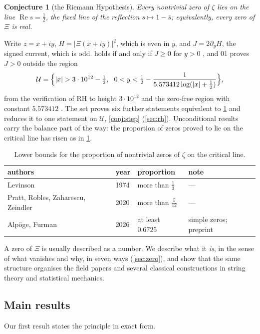 \documentclass[11pt]{article}
\newtheorem{conjecture}{Conjecture}
\theoremstyle{definition}\newtheorem{definition}[theorem]{Definition}
\theoremstyle{remark}\newtheorem{remark}[theorem]{Remark}
\renewcommand{\Re}{\operatorname{Re}}\renewcommand{\Im}{\operatorname{Im}}
\begin{document}
\begin{conjecture}[the Riemann Hypothesis]\label{conj:RH}
Every nontrivial zero of $\zeta$ lies on the line $\Re s=\frac12$, the fixed line of the reflection $s\mapsto1-\bar s$; equivalently, every zero of $\Xi$ is real.
\end{conjecture}

Write $z=x+iy$, $H=|\Xi(x+iy)|^2$, which is even in $y$, and $J=2\partial_yH$, the signed current, which is odd.  holds if and only if $J\ge0$ for $y>0$ \cite{SD,Lagarias,SMath}, and 01 proves $J>0$ outside the region
\[
\mathcal U=\Bigl\{|x|>3\cdot10^{12}-\tfrac12,\ \ 0<y<\tfrac12-\frac1{5.573412\log(|x|+\frac12)}\Bigr\},
\]
from the verification of RH to height $3\cdot10^{12}$ \cite{PT} and the zero-free region with constant $5.573412$ \cite{MT}. The set proves six further statements equivalent to \cref{conj:RH} and reduces it to one statement on $\mathcal U$, \cref{conj:step} (\cref{sec:rh}). Unconditional results carry the balance part of the way: the proportion of zeros proved to lie on the critical line has risen as in \cref{tab:prior}.

\begin{table}[ht]\centering\small
\caption{Lower bounds for the proportion of nontrivial zeros of $\zeta$ on the critical line.}\label{tab:prior}
\begin{tabular}{@{}llll@{}}\toprule
authors & year & proportion & note\\\midrule
Levinson \cite{Levinson} & 1974 & more than $\frac13$ & ---\\
Pratt, Robles, Zaharescu, Zeindler \cite{PRZZ} & 2020 & more than $\frac5{12}$ & ---\\
Alp\"oge, Furman \cite{AF} & 2026 & at least $0.6725$ & simple zeros; preprint\\\bottomrule
\end{tabular}
\end{table}

A zero of $\Xi$ is usually described as a number. We describe what it \emph{is}, in the sense of what vanishes and why, in seven ways (\cref{sec:zero}), and show that the same structure organises the field papers and several classical constructions in string theory and statistical mechanics.

\subsection{Main results}
Our first result states the principle in exact form.
\end{document}
